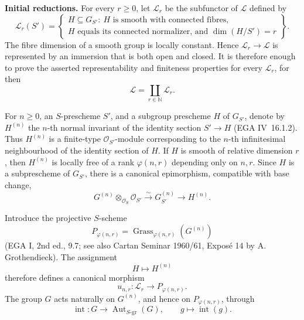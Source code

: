 
\medskip\noindent\textbf{Initial reductions.}
For every \(r\geq0\), let \(\mathcal L_r\) be the subfunctor of
\(\mathcal L\) defined by
\[
\mathcal L_r(S')=
\left\{
\begin{array}{c}
H\subseteq G_{S'}:\ H\text{ is smooth with connected fibres,}\\
H\text{ equals its connected normalizer, and }\dim(H/S')=r
\end{array}
\right\}.
\]
The fibre dimension of a smooth group is locally constant. Hence
\(\mathcal L_r\to\mathcal L\) is represented by an immersion that is
both open and closed. It is therefore enough to prove the asserted
representability and finiteness properties for every
\(\mathcal L_r\), for then
\[
  \mathcal L=\coprod_{r\in\mathbb N}\mathcal L_r.
\]

For \(n\geq0\), an \(S\)-prescheme \(S'\), and a subgroup prescheme
\(H\) of \(G_{S'}\), denote by \(H^{(n)}\) the \(n\)-th normal
invariant of the identity section \(S'\to H\) (EGA IV~16.1.2).
Thus \(H^{(n)}\) is a finite-type \(\mathcal O_{S'}\)-module
corresponding to the \(n\)-th infinitesimal neighbourhood of the
identity section of \(H\). If \(H\) is smooth of relative dimension
\(r\), then \(H^{(n)}\) is locally free of a rank
\(\varphi(n,r)\) depending only on \(n,r\). Since \(H\) is a
subprescheme of \(G_{S'}\), there is a canonical epimorphism,
compatible with base change,
\[
 G^{(n)}\otimes_{\mathcal O_S}\mathcal O_{S'}
 \xrightarrow{\sim}G_{S'}^{(n)}
 \longrightarrow H^{(n)}.
\]

Introduce the projective \(S\)-scheme
\[
  P_{\varphi(n,r)}
   =\operatorname{Grass}_{\varphi(n,r)}(G^{(n)})
\]
(EGA I, 2nd ed., 9.7; see also Cartan Seminar 1960/61,
Exposé 14 by A. Grothendieck). The assignment
\[
  H\longmapsto H^{(n)}
\]
therefore defines a canonical morphism
\[
  u_{n,r}:\mathcal L_r\longrightarrow P_{\varphi(n,r)}.
\]
The group \(G\) acts naturally on \(G^{(n)}\), and hence on
\(P_{\varphi(n,r)}\), through
\[
 \operatorname{int}:G\longrightarrow
 \operatorname{Aut}_{S\text{-}\mathrm{gr}}(G),
 \qquad g\longmapsto\operatorname{int}(g).
\]

